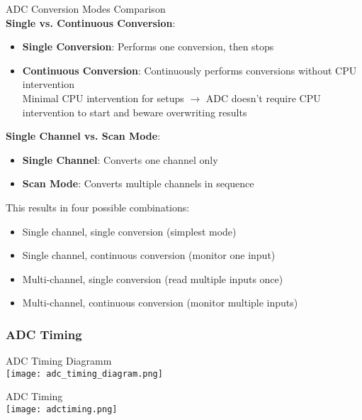 \begin{concept}{ADC Conversion Modes Comparison}\\
\textbf{Single vs. Continuous Conversion}:
\begin{itemize}
    \item \textbf{Single Conversion}: Performs one conversion, then stops
    \item \textbf{Continuous Conversion}: Continuously performs conversions without CPU intervention\\
    Minimal CPU intervention for setups $\rightarrow$ ADC doesn't require CPU intervention to start and beware overwriting results
\end{itemize}
\textbf{Single Channel vs. Scan Mode}:
\begin{itemize}
    \item \textbf{Single Channel}: Converts one channel only
    \item \textbf{Scan Mode}: Converts multiple channels in sequence
\end{itemize}
This results in four possible combinations:
\begin{itemize}
    \item Single channel, single conversion (simplest mode)
    \item Single channel, continuous conversion (monitor one input)
    \item Multi-channel, single conversion (read multiple inputs once)
    \item Multi-channel, continuous conversion (monitor multiple inputs)
\end{itemize}

\end{concept}

\subsubsection{ADC Timing}

\begin{KR}{ADC Timing Diagramm}\\
    \texttt{[image: adc\_timing\_diagram.png]}
\end{KR}

\begin{concept}{ADC Timing}\\
    \texttt{[image: adctiming.png]}
\end{concept}


